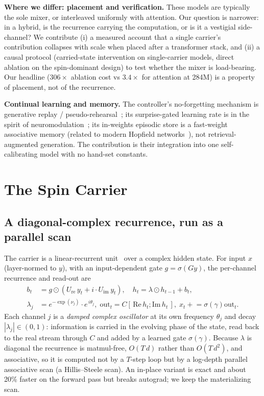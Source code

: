 \documentclass[journal]{IEEEtran}
\begin{document}
\textbf{Where we differ: placement and verification.} These models are typically the sole mixer, or interleaved uniformly with attention. Our question is narrower: in a hybrid, is the recurrence carrying the computation, or is it a vestigial side-channel? We contribute (i) a measured account that a single carrier's contribution collapses with scale when placed after a transformer stack, and (ii) a causal protocol (carried-state intervention on single-carrier models, direct ablation on the spin-dominant design) to test whether the mixer is load-bearing. Our headline ($306\times$ ablation cost vs $3.4\times$ for attention at 284M) is a property of placement, not of the recurrence.

\textbf{Continual learning and memory.} The controller's no-forgetting mechanism is generative replay / pseudo-rehearsal~\cite{robins1995}; its surprise-gated learning rate is in the spirit of neuromodulation~\cite{doya2002}; its in-weights episodic store is a fast-weight associative memory (related to modern Hopfield networks~\cite{ramsauer2021}), not retrieval-augmented generation. The contribution is their integration into one self-calibrating model with no hand-set constants.

\section{The Spin Carrier}
\label{sec:carrier}
\subsection{A diagonal-complex recurrence, run as a parallel scan}
The carrier is a linear-recurrent unit~\cite{gu2022s4} over a complex hidden state. For input $x$ (layer-normed to $y$), with an input-dependent gate $g=\sigma(G y)$, the per-channel recurrence and read-out are
\begin{align}
b_t &= g \odot (U_{\mathrm{re}}\, y_t + i \cdot U_{\mathrm{im}}\, y_t), \quad h_t = \lambda \odot h_{t-1} + b_t, \\
\lambda_j &= e^{-\exp(\nu_j)} \cdot e^{\,i\theta_j}, \; \mathrm{out}_t = C[\,\mathrm{Re}\, h_t ; \mathrm{Im}\, h_t\,], \; x_t \mathrel{+}= \sigma(\gamma) \mathrm{out}_t. \nonumber
\end{align}
Each channel $j$ is a \emph{damped complex oscillator} at its own frequency $\theta_j$ and decay $|\lambda_j|\in(0,1)$: information is carried in the evolving phase of the state, read back to the real stream through $C$ and added by a learned gate $\sigma(\gamma)$. Because $\lambda$ is diagonal the recurrence is matmul-free, $O(T\,d)$ rather than $O(T\,d^2)$, and associative, so it is computed not by a $T$-step loop but by a log-depth parallel associative scan (a Hillis--Steele scan). An in-place variant is exact and about 20\% faster on the forward pass but breaks autograd; we keep the materializing scan.
\end{document}
